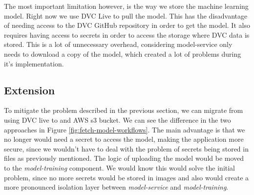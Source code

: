 The most important limitation however, is the way we store the machine learning model. Right now we use DVC Live to pull the model. This has the disadvantage of needing access to the DVC GitHub repository in order to get the model. It also requires having access to secrets in order to access the storage where DVC data is stored. This is a lot of unnecessary overhead, considering model-service only needs to download a copy of the model, which created a lot of problems during it's implementation.   
\subsection{Extension} %
To mitigate the problem described in the previous section, we can migrate from using DVC live to and AWS s3 bucket. We can see the difference in the two approaches in Figure \ref{fig:fetch-model-workflows}. The main advantage is that we no longer would need a secret to access the model, making the application more secure, since we wouldn't have to deal with the problem of secrets being stored in files as previously mentioned. The logic of uploading the model would be moved to the \emph{model-training} component. We would know this would solve the initial problem, since no more secrets would be stored in images and also would create a more pronounced isolation layer between \emph{model-service} and \emph{model-training}.

